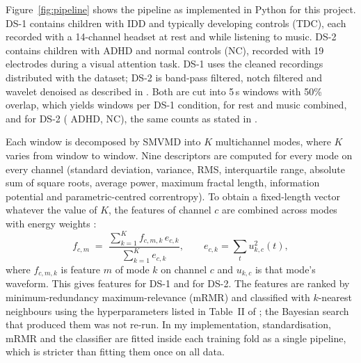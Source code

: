 \documentclass[11pt,a4paper]{article}
\begin{document}
Figure~\ref{fig:pipeline} shows the pipeline as implemented in Python for this
project. DS-1 \cite{sareen2020data} contains \nSubjDisRest{} children with IDD
and \nSubjCtlRest{} typically developing controls (TDC), each recorded with a
14-channel headset at rest and while listening to music. DS-2 \cite{motie2020}
contains \nSubjDisAdhd{} children with ADHD and \nSubjCtlAdhd{} normal controls
(NC), recorded with 19 electrodes during a visual attention task. DS-1 uses the
cleaned recordings distributed with the dataset; DS-2 is band-pass filtered,
notch filtered and wavelet denoised as described in \cite{chandela2025}. Both
are cut into 5\,s windows with 50\% overlap, which yields \nSegRest{} windows
per DS-1 condition, \nSegRestMusic{} for rest and music combined, and
\nSegAdhd{} for DS-2 (\nSegDisAdhd{} ADHD, \nSegCtlAdhd{} NC), the same counts
as stated in \cite{chandela2025}.

Each window is decomposed by SMVMD into $K$ multichannel modes, where $K$
varies from window to window. Nine descriptors are computed for every mode on
every channel (standard deviation, variance, RMS, interquartile range, absolute
sum of square roots, average power, maximum fractal length, information
potential and parametric-centred correntropy). To obtain a fixed-length vector
whatever the value of $K$, the features of channel $c$ are combined across
modes with energy weights \cite{chandela2025}:
\begin{equation}
  f_{c,m} \;=\; \frac{\sum_{k=1}^{K} f_{c,m,k}\, e_{c,k}}{\sum_{k=1}^{K} e_{c,k}},
  \qquad e_{c,k} = \sum_{t} u_{k,c}^2(t),
  \label{eq:energy}
\end{equation}
where $f_{c,m,k}$ is feature $m$ of mode $k$ on channel $c$ and $u_{k,c}$ is
that mode's waveform. This gives \nFeatRest{} features for DS-1 and \nFeatAdhd{} for DS-2. The
features are ranked by minimum-redundancy maximum-relevance (mRMR)
and classified with $k$-nearest neighbours using the
hyperparameters listed in Table~II of \cite{chandela2025}; the Bayesian search
that produced them was not re-run. In my implementation, standardisation,
mRMR and the classifier are fitted inside each training fold as a single
pipeline, which is stricter than fitting them once on all data.
\end{document}
